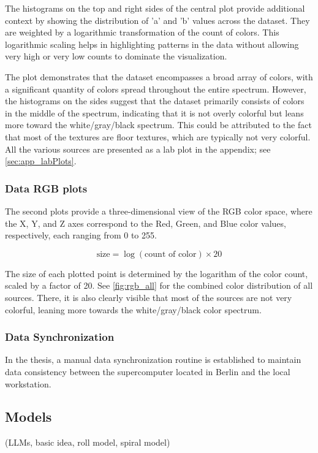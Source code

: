     The histograms on the top and right sides of the central plot provide additional context by showing the distribution of 'a' and 'b' values across the dataset. They are weighted by a logarithmic transformation of the count of colors. This logarithmic scaling helps in highlighting patterns in the data without allowing very high or very low counts to dominate the visualization.

    The plot demonstrates that the dataset encompasses a broad array of colors, with a significant quantity of colors spread throughout the entire spectrum. However, the histograms on the sides suggest that the dataset primarily consists of colors in the middle of the spectrum, indicating that it is not overly colorful but leans more toward the white/gray/black spectrum. This could be attributed to the fact that most of the textures are floor textures, which are typically not very colorful. All the various sources are presented as a lab plot in the appendix; see \autoref{sec:app_labPlots}.

    \subsubsection{Data RGB plots}

    The second plots provide a three-dimensional view of the RGB color space, where the X, Y, and Z axes correspond to the Red, Green, and Blue color values, respectively, each ranging from 0 to 255. 

    \[
    \text{size} = \log(\text{count of color}) \times 20
    \]

    The size of each plotted point is determined by the logarithm of the color count, scaled by a factor of 20. See \autoref{fig:rgb_all} for the combined color distribution of all sources. There, it is also clearly visible that most of the sources are not very colorful, leaning more towards the white/gray/black color spectrum.

    \subsubsection{Data Synchronization}

    In the thesis, a manual data synchronization routine is established to maintain data consistency between the supercomputer located in Berlin and the local workstation.

\newpage
\subsection{Models}
    (LLMs, basic idea, roll model, spiral model)

